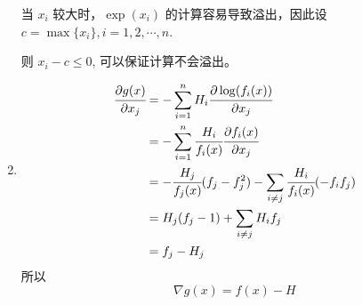 \documentclass[11pt,letter,notitlepage]{article}
\begin{document}
\begin{solution}
\begin{enumerate}
		      当 $x_i$ 较大时，$\exp(x_i)$ 的计算容易导致溢出，因此设 $c=\max\{x_i\}, i=1,2,\cdots,n$.

		      则 $x_i-c \leq0$, 可以保证计算不会溢出。
		\item  $$\begin{aligned}
				      \cfrac{\partial g(x)}{\partial x_j}
				       & = -\sum_{i=1}^{n}{H_i\cfrac{\partial \log(f_i(x))}{\partial x_j}}                  \\
				       & = -\sum_{i=1}^{n}{\cfrac{H_i}{f_i(x)} \cfrac{\partial f_i(x)}{\partial x_j}}       \\
				       & = -\cfrac{H_j}{f_j(x)}(f_j-f_j^2) - \sum_{i\neq j}{\cfrac{H_i}{f_i(x)} (-f_i f_j)} \\
				       & = H_j (f_j-1) + \sum_{i\neq j}{H_i f_j}                                            \\
				       & = f_j - H_j
			      \end{aligned}$$
		      所以
		      $$\nabla g(x)=f(x)-H$$
	\end{enumerate}
\end{solution}

\newpage
\end{document}
